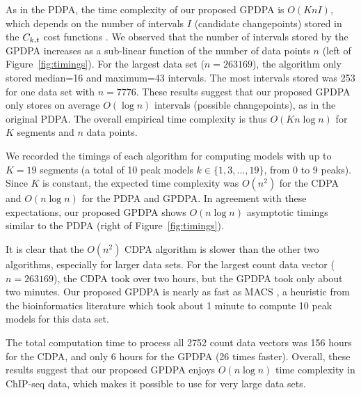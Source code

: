 \documentclass{article}
\begin{document}
As in the PDPA, the time complexity of our proposed GPDPA is
$O(K n I)$, which depends on the number of intervals $I$ (candidate
changepoints) stored in the $C_{k,t}$ cost functions
\citep{pruned-dp-new}. We observed that the number of intervals stored
by the GPDPA increases as a sub-linear function of the number of data
points $n$ (left of Figure~\ref{fig:timings}). For the largest data
set ($n=263169$), the algorithm only stored median=16 and maximum=43
intervals. The most intervals stored was 253 for one data set with
$n=7776$. These results suggest that our proposed GPDPA only stores on
average $O(\log n)$ intervals (possible changepoints), as in the
original PDPA. The overall empirical time complexity is thus
$O(K n \log n)$ for $K$ segments and $n$ data points.

We recorded the timings of each algorithm for computing models with up
to $K=19$ segments (a total of 10 peak models $k\in\{1,3,\dots,19\}$,
from 0 to 9 peaks). Since $K$ is constant, the expected time
complexity was $O(n^2)$ for the CDPA and $O(n \log n)$ for the PDPA
and GPDPA. In agreement with these expectations, our proposed GPDPA
shows $O(n\log n)$ asymptotic timings similar to the PDPA (right of
Figure~\ref{fig:timings}). 

It is clear that the $O(n^2)$ CDPA algorithm is slower than the other
two algorithms, especially for larger data sets. For the largest count
data vector ($n=263169$), the CDPA took over two hours, but the GPDPA
took only
about two minutes. Our proposed GPDPA is nearly as fast as MACS
\citep{MACS}, a heuristic from the bioinformatics literature which
took about 1 minute to compute 10 peak models for this data set. 

The total computation time to process all 2752 count data vectors was
156 hours for the CDPA, and only 6 hours for the GPDPA (26 times
faster). Overall, these results suggest that our proposed GPDPA enjoys
$O(n\log n)$ time complexity in ChIP-seq data, which makes it possible
to use for very large data sets.



\end{document}
